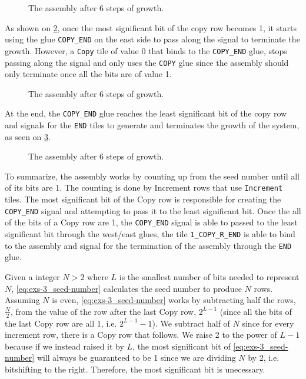 \documentclass[11pt]{article}
\begin{document}
\begin{figure}[htbp]
    \centering
    
    \caption{The assembly after 6 steps of growth.}
    \label{fig:exs-3_copy-row}
\end{figure}

\newpage

As shown on \cref{fig:exs-3_mid}, once the most significant bit of the copy row becomes 1, it starts
using the glue \verb|COPY_END| on the east side to pass along the signal to terminate the growth.
However, a \verb|Copy| tile of value 0 that binds to the \verb|COPY_END| glue, stops passing along
the signal and only uses the \verb|COPY| glue since the assembly should only terminate once all the
bits are of value 1.

\begin{figure}[htbp]
    \centering
    
    \caption{The assembly after 6 steps of growth.}
    \label{fig:exs-3_mid}
\end{figure}

At the end, the \verb|COPY_END| glue reaches the least significant bit of the copy row and signals
for the \verb|END| tiles to generate and terminates the growth of the system, as seen on
\cref{fig:exs-3_ending}.

\begin{figure}[htbp]
    \centering
    
    \caption{The assembly after 6 steps of growth.}
    \label{fig:exs-3_ending}
\end{figure}

To summarize, the assembly works by counting up from the seed number until all of its bits are 1.
The counting is done by Increment rows that use \verb|Increment| tiles. The most significant bit of
the Copy row is responsible for creating the \verb|COPY_END| signal and attempting to pass it to the
least significant bit. Once the all of the bits of a Copy row are 1, the \verb|COPY_END| signal is
able to passed to the least significant bit through the west/east glues, the tile
\verb|1_COPY_R_END| is able to bind to the assembly and signal for the termination of the assembly
through the \verb|END| glue.

Given a integer $N > 2$ where $L$ is the smallest number of bits needed to represent $N$,
\cref{eq:exs-3_seed-number} calculates the seed number to produce $N$ rows. Assuming $N$ is even,
\cref{eq:exs-3_seed-number} works by subtracting half the rows, $\frac{N}{2}$, from the value of the
row after the last Copy row, $2^{L - 1}$ (since all the bits of the last Copy row are all 1, i.e.
$2^{L - 1} - 1$). We subtract half of $N$ since for every increment row, there is a Copy row that
follows. We raise 2 to the power of $L - 1$ because if we instead raised it by $L$, the most
significant bit of \cref{eq:exs-3_seed-number} will always be guaranteed to be 1 since we are
dividing $N$ by 2, i.e. bitshifting to the right. Therefore, the most significant bit is unecessary.
\end{document}
